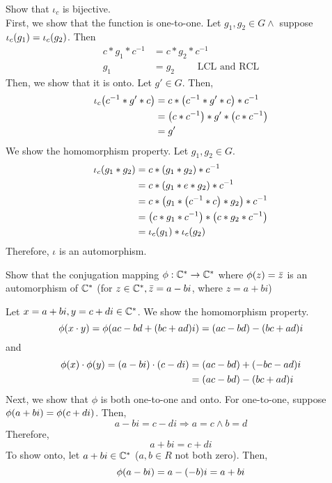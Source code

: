 \begin{solution}
    Show that $\iota_c$ is bijective. \\
    First, we show that the function is one-to-one. Let $g_1, g_2 \in G \land $ suppose $\iota_c (g_1) = \iota_c \qty(g_2)$. Then 
    \begin{align*}
        c \ast g_1 \ast c^{-1} &= c  * g_2 \ast c^{-1} \\
        g_1 &= g_2 \hspace{2em} \text{ LCL and RCL}
    \end{align*}
    Then, we show that it is onto. Let $g' \in G$. Then,
    \begin{align*}
        \iota_c \qty(c^{-1} \ast g' \ast c) &=  c \ast \qty(c^{-1} \ast g' \ast c) \ast c^{-1} \\
        &= \qty(c \ast c^{-1}) \ast g' \ast \qty(c \ast c^{-1}) \\
        &= g'
    \end{align*}
    We show the homomorphism property. Let $g_1, g_2 \in G$.
    \begin{align*}
        \iota_c \qty(g_1 \ast g_2) &= c \ast \qty(g_1 \ast g_2) \ast c^{-1} \\
        &= c \ast \qty(g_1 \ast e \ast g_2) \ast c^{-1} \\
        &= c \ast \qty(g_1 \ast \qty( c^{-1} \ast c) \ast g_2 ) \ast c^{-1} \\
        &= \qty(c \ast g_1 \ast c^{-1}) \ast \qty(c \ast g_2 \ast c^{-1}) \\
        &= \iota_c \qty(g_1) \ast \iota_c \qty(g_2)
    \end{align*}
    Therefore, $\iota$ is an automorphism.
\end{solution}

\begin{exercise}
    Show that the conjugation mapping $\phi : \mathbb{C}^* \to \mathbb{C}^*$ where $\phi \qty(z) = \bar{z}$ is an automorphism of $\mathbb{C}^*$ (for $z \in \mathbb{C}^*, \bar{z} = a -bi$, where $z = a + bi$)
\end{exercise}

\begin{solution}
    Let $x = a +bi, y = c + di \in \mathbb{C}^*$. We show the homomorphism property.
    \[ \phi \qty(x \cdot y) = \phi \qty(ac -bd + \qty(bc + ad)i) = \qty(ac - bd) - \qty(bc + ad)i \]
    and
    \begin{align*}
        \phi(x) \cdot \phi(y) = \qty(a - bi) \cdot \qty(c - di) &= \qty(ac - bd) + \qty(-bc - ad)i \\
        &=\qty(ac - bd) - \qty(bc + ad)i
    \end{align*}
    Next, we show that $\phi$ is both one-to-one and onto. For one-to-one, suppose $\phi \qty(a + bi) = \phi \qty(c + di)$. Then,
    \[ a - bi = c - di \Rightarrow a = c \land b = d\]
    Therefore,
    \[ a + bi = c + di \]
    To show onto, let $a + bi \in \mathbb{C}^*$ ($a, b \in R$ not both zero). Then,
    \[ \phi \qty(a - bi) = a - \qty(-b) i = a + bi \]
\end{solution}


